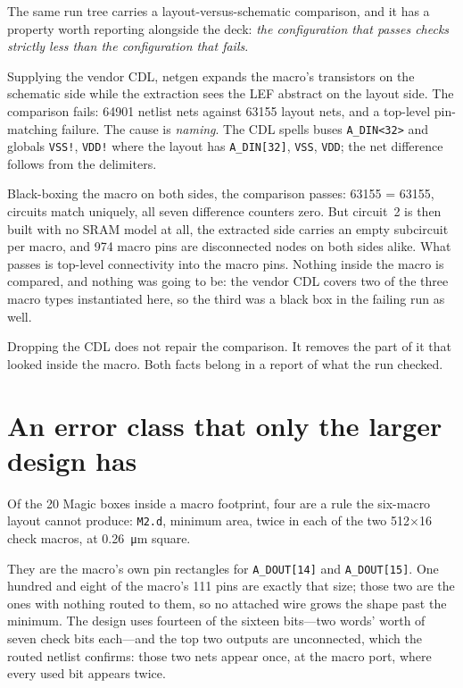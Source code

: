 \documentclass[11pt,a4paper]{article}
\begin{document}
The same run tree carries a layout-versus-schematic comparison, and it
has a property worth reporting alongside the deck: \emph{the
configuration that passes checks strictly less than the configuration
that fails}.

Supplying the vendor CDL, netgen expands the macro's transistors on the
schematic side while the extraction sees the LEF abstract on the layout
side. The comparison fails: \num{64901} netlist nets against \num{63155}
layout nets, and a top-level pin-matching failure. The cause is
\emph{naming}. The CDL spells buses \texttt{A\_DIN<32>} and globals
\texttt{VSS!}, \texttt{VDD!} where the layout has \texttt{A\_DIN[32]},
\texttt{VSS}, \texttt{VDD}; the net difference follows from the
delimiters.

Black-boxing the macro on both sides, the comparison passes:
\num{63155} = \num{63155}, circuits match uniquely, all seven difference
counters zero. But circuit~2 is then built with no SRAM model at all, the
extracted side carries an empty subcircuit per macro, and \num{974} macro
pins are disconnected nodes on both sides alike. What passes is top-level
connectivity into the macro pins. Nothing inside the macro is compared,
and nothing was going to be: the vendor CDL covers two of the three macro
types instantiated here, so the third was a black box in the failing run
as well.

Dropping the CDL does not repair the comparison. It removes the part of
it that looked inside the macro. Both facts belong in a report of what
the run checked.

\section{An error class that only the larger design has}
\label{sec:m2d}

Of the \num{20} Magic boxes inside a macro footprint, four are a rule the
six-macro layout cannot produce: \texttt{M2.d}, minimum area, twice in
each of the two \SI{512}{}$\times$\SI{16}{} check macros, at
\SI{0.26}{\micro\meter} square.

They are the macro's own pin rectangles for \texttt{A\_DOUT[14]} and
\texttt{A\_DOUT[15]}. One hundred and eight of the macro's \num{111} pins
are exactly that size; those two are the ones with nothing routed to
them, so no attached wire grows the shape past the minimum. The design
uses fourteen of the sixteen bits---two words' worth of seven check bits
each---and the top two outputs are unconnected, which the routed netlist
confirms: those two nets appear once, at the macro port, where every used
bit appears twice.
\end{document}
